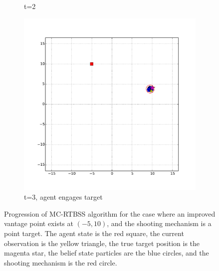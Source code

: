 \begin{figure}
\begin{subfigure}[b]{0.3\textwidth}
	                \caption{t=2}
	                \label{fig:vantage_t_2}
	        \end{subfigure}
	        \begin{subfigure}[b]{0.3\textwidth}
	                \includegraphics[width=\textwidth]{vantage_t_3}
	                \caption{t=3, agent engages target}
	                \label{fig:vantage_t_3}
	        \end{subfigure}
	        \caption{Progression of MC-RTBSS algorithm for the case where an improved vantage point exists at $(-5,10)$, and the shooting mechanism is a point target. The agent state is the red square, the current observation is the yellow triangle, the true target position is the magenta star, the belief state particles are the blue circles, and the shooting mechanism is the red circle.}\label{fig:vantage}
	\end{figure}